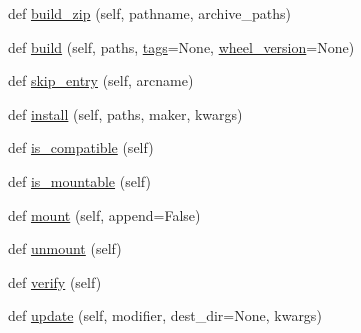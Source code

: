 \begin{DoxyCompactItemize}
\item 
def \hyperlink{classpip_1_1__vendor_1_1distlib_1_1wheel_1_1Wheel_ad77b3d32f4917bff298040e6e7756c75}{build\+\_\+zip} (self, pathname, archive\+\_\+paths)
\item 
def \hyperlink{classpip_1_1__vendor_1_1distlib_1_1wheel_1_1Wheel_a0620c62c19f38ff205468e2bb575cb9c}{build} (self, paths, \hyperlink{classpip_1_1__vendor_1_1distlib_1_1wheel_1_1Wheel_a02d69461124ef17ab7d4fc8e26d46ee5}{tags}=None, \hyperlink{classpip_1_1__vendor_1_1distlib_1_1wheel_1_1Wheel_a827976d873f42ebc8b67dd4f11424daf}{wheel\+\_\+version}=None)
\item 
def \hyperlink{classpip_1_1__vendor_1_1distlib_1_1wheel_1_1Wheel_ae2c0c1ccf255c5500043ae3ac805430c}{skip\+\_\+entry} (self, arcname)
\item 
def \hyperlink{classpip_1_1__vendor_1_1distlib_1_1wheel_1_1Wheel_a1210bb0d68e586635bc971abb108b4d4}{install} (self, paths, maker, kwargs)
\item 
def \hyperlink{classpip_1_1__vendor_1_1distlib_1_1wheel_1_1Wheel_adda0c357fe3d41a65ae43d8e9e2a5e82}{is\+\_\+compatible} (self)
\item 
def \hyperlink{classpip_1_1__vendor_1_1distlib_1_1wheel_1_1Wheel_ac425a3d38c3af5b9a05584d68db70f29}{is\+\_\+mountable} (self)
\item 
def \hyperlink{classpip_1_1__vendor_1_1distlib_1_1wheel_1_1Wheel_a63bb3e266ae4ce08b7856466b24f7de8}{mount} (self, append=False)
\item 
def \hyperlink{classpip_1_1__vendor_1_1distlib_1_1wheel_1_1Wheel_a09ab4eb1a313fa621f70b690c05bf579}{unmount} (self)
\item 
def \hyperlink{classpip_1_1__vendor_1_1distlib_1_1wheel_1_1Wheel_a3792fb283924a1add010ebf4fc259a76}{verify} (self)
\item 
def \hyperlink{classpip_1_1__vendor_1_1distlib_1_1wheel_1_1Wheel_af35b55681877dd37bb4a62e12cd1dd05}{update} (self, modifier, dest\+\_\+dir=None, kwargs)
\end{DoxyCompactItemize}
